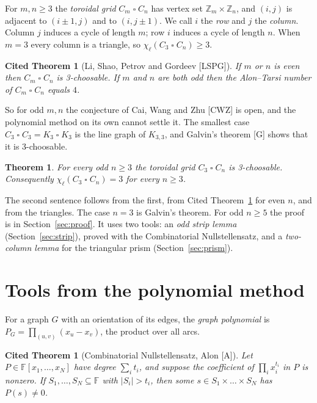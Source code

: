 \documentclass[11pt]{article}
\theoremstyle{plain}
\newtheorem{citedtheorem}[theorem]{Cited Theorem}
\newtheorem{maintheorem}{Theorem}
\theoremstyle{definition}
\theoremstyle{remark}
\newcommand{\T}{\mathbin{\square}}
\newcommand{\Z}{\mathbb{Z}}
\begin{document}
For $m, n \ge 3$ the \emph{toroidal grid} $C_m \T C_n$ has vertex set $\Z_m \times \Z_n$, and
$(i, j)$ is adjacent to $(i \pm 1, j)$ and to $(i, j \pm 1)$. We call $i$ the \emph{row} and $j$
the \emph{column}. Column $j$ induces a cycle of length $m$; row $i$ induces a cycle of length
$n$. When $m = 3$ every column is a triangle, so $\chi_\ell(C_3 \T C_n) \ge 3$.

\begin{citedtheorem}[{Li, Shao, Petrov and Gordeev [LSPG]}]\label{thm:lspg}
If $m$ or $n$ is even then $C_m \T C_n$ is 3-choosable. If $m$ and $n$ are both odd then the
Alon--Tarsi number of $C_m \T C_n$ equals $4$.
\end{citedtheorem}

So for odd $m, n$ the conjecture of Cai, Wang and Zhu [CWZ] is open, and the polynomial method
on its own cannot settle it. The smallest case $C_3 \T C_3 = K_3 \T K_3$ is the line graph of
$K_{3,3}$, and Galvin's theorem [G] shows that it is 3-choosable.

\begin{maintheorem}\label{thm:main}
For every odd $n \ge 3$ the toroidal grid $C_3 \T C_n$ is 3-choosable. Consequently
$\chi_\ell(C_3 \T C_n) = 3$ for every $n \ge 3$.
\end{maintheorem}

The second sentence follows from the first, from Cited Theorem~\ref{thm:lspg} for even $n$, and
from the triangles. The case $n = 3$ is Galvin's theorem. For odd $n \ge 5$ the proof is in
Section~\ref{sec:proof}. It uses two tools: an \emph{odd strip lemma} (Section~\ref{sec:strip}),
proved with the Combinatorial Nullstellensatz, and a \emph{two-column lemma} for the triangular
prism (Section~\ref{sec:prism}).

\section{Tools from the polynomial method}

For a graph $G$ with an orientation of its edges, the \emph{graph polynomial} is
$P_G = \prod_{(u,v)} (x_u - x_v)$, the product over all arcs.

\begin{citedtheorem}[Combinatorial Nullstellensatz, Alon {[A]}]\label{thm:cn}
Let $P \in \mathbb{F}[x_1, \dots, x_N]$ have degree $\sum_i t_i$, and suppose the coefficient of
$\prod_i x_i^{t_i}$ in $P$ is nonzero. If $S_1, \dots, S_N \subseteq \mathbb{F}$ with
$|S_i| > t_i$, then some $s \in S_1 \times \dots \times S_N$ has $P(s) \ne 0$.
\end{citedtheorem}
\end{document}
